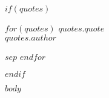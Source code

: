 \documentclass[a4paper, twoside]{tufte-book}
\newcommand{\openepigraph}[2]{%
  \large
  {\parindent0pt \emph{#1}}\\%
  \vspace{1pc}
  {\parindent0pt {#2}}%
}
\begin{document}
$if(quotes)$
\newpage\thispagestyle{empty}
\begin{fullwidth}
\null\vfill
$for(quotes)$
\openepigraph{$quotes.quote$}{$quotes.author$}
$sep$\vfill
$endfor$
\vfill
\end{fullwidth}
$endif$

\mainmatter

$body$

\backmatter

\cleardoublepage


\begin{fullwidth}
  
  
\end{fullwidth}

\cleardoublepage

\end{document}
